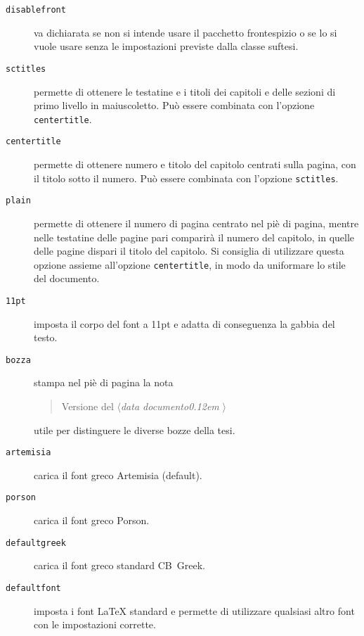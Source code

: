 \documentclass{suftesi}
\DeclareRobustCommand*{\meta}[1]{%
  $\langle${\normalfont\itshape#1\kern0.12em }$\rangle$}
\newcommand*{\option}{\texttt}
\newcommand{\pack}{\textsf}
\def\suftesi{\textsf{suftesi}}
\begin{document}
\begin{multicols}{2}
\begin{description}
\item [\option{disablefront}] \mbox{}\par
 va dichiarata se non si intende usare il pacchetto \pack{frontespizio} o se lo si vuole usare senza le impostazioni previste dalla classe \suftesi{}.
\item [\option{sctitles}]\mbox{}\par permette di ottenere le testatine e i titoli dei capitoli e delle sezioni di primo livello in maiuscoletto. Può essere combinata con l'opzione \option{centertitle}.
\item [\option{centertitle}]\mbox{}\par permette di ottenere numero e titolo del capitolo centrati sulla pagina, con il titolo sotto il numero. Può essere combinata con l'opzione \option{sctitles}.
\item [\option{plain}]\mbox{}\par permette di ottenere il numero di pagina centrato nel piè di pagina, mentre nelle testatine delle pagine pari comparirà il numero del capitolo, in quelle delle pagine dispari il titolo del capitolo. Si consiglia di utilizzare questa opzione assieme all'opzione \option{centertitle}, in modo da uniformare lo stile del documento.
\item [\option{11pt}]\mbox{}\par imposta il corpo del font a 11\unit{pt} e adatta di conseguenza la gabbia del testo. 
\item [\option{bozza}]\mbox{}\par stampa nel piè di pagina la nota 
\begin{quote} 
Versione del \meta{data documento}
\end{quote}
utile per distinguere le diverse bozze della tesi.
\item [\option{artemisia}]\mbox{}\par carica il font greco Artemisia (default).
\item [\option{porson}]\mbox{}\par carica il font greco Porson.
\item [\option{defaultgreek}]\mbox{}\par carica il font greco standard CB~Greek.
\item [\option{defaultfont}]\mbox{}\par imposta i font \LaTeX{} standard e permette di utilizzare qualsiasi altro font con le impostazioni corrette.
\end{description}
\end{multicols}
\end{document}
